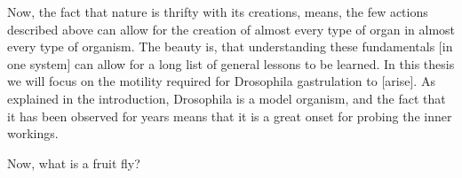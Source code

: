 Now, the fact that nature is thrifty with its creations, means, the few actions described above can allow for the creation of almost every type of organ in almost every type of organism. The beauty is, that understanding these fundamentals [in one system] can allow for a long list of general lessons to be learned. In this thesis we will focus on the motility required for Drosophila gastrulation to [arise]. As explained in the introduction, Drosophila is a model organism, and the fact that it has been observed for years means that it is a great onset for probing the inner workings.

Now, what is a fruit fly? 






